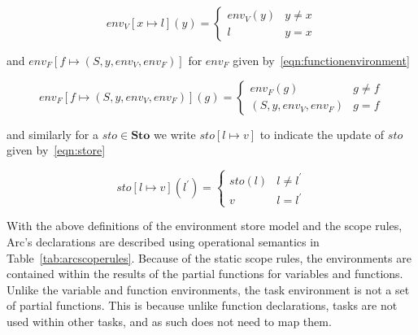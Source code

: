 \begin{equation}\label{eqn:variableenvironment}
    env_V[x \mapsto l](y) =
    \begin{cases}
        env_V(y) & y \neq x \\
        l        & y = x
    \end{cases}
\end{equation}


\noindent and $env_F[ f \mapsto (S, y, env_V, env_F)]$ for $env_F$ given by~\ref{eqn:functionenvironment}


\begin{equation}\label{eqn:functionenvironment}
    env_F[f \mapsto (S, y, env_V, env_F)](g) =
    \begin{cases}
        env_F(g)             & g \neq f \\
        (S, y, env_V, env_F) & g = f
    \end{cases}
\end{equation}


\noindent and similarly for a $sto \in \textbf{Sto}$ we write $sto[ l \mapsto v ]$ to indicate the update of $sto$ given by~\ref{eqn:store}


\begin{equation}\label{eqn:store}
    sto[l \mapsto v](l^\prime) =
    \begin{cases}
        sto(l) & l \neq l^\prime \\
        v      & l = l^\prime
    \end{cases}
\end{equation}


With the above definitions of the environment store model and the scope rules, Arc's declarations are described using operational semantics in Table~\ref{tab:arcscoperules}. Because of the static scope rules, the environments are contained within the results of the partial functions for variables and functions. Unlike the variable and function environments, the task environment is not a set of partial functions. This is because unlike function declarations, tasks are not used within other tasks, and as such does not need to map them.


